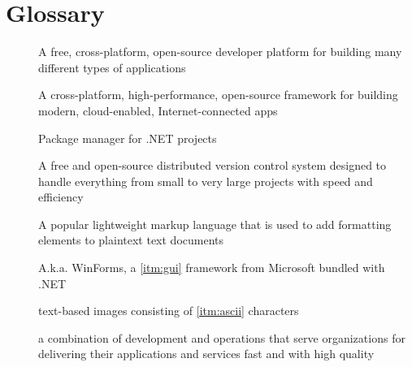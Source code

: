 \chapter*{Glossary}

\begin{description}
    \item [] A free, cross-platform, open-source developer platform for building many different types of applications \cite{microsoft_what_2022}
    \item [] A cross-platform, high-performance, open-source framework for building modern, cloud-enabled, Internet-connected apps \cite{anderson_overview_2022}
    \item [] Package manager for .NET projects \cite{microsoft_nuget_2022}
    \item [] A free and open-source distributed version control system designed to handle everything from small to very large projects with speed and efficiency \cite{git_git_2022}
    \item [] A popular lightweight markup language that is used to add formatting elements to plaintext text documents \cite{cone_getting_2022}
    \item [] A.k.a. WinForms, a \ref{itm:gui} framework from Microsoft bundled with .NET \cite{george_what_2022}
    \item [] text-based images consisting of \ref{itm:ascii} characters \cite{randal_ascii_2015}
    \item [] a combination of development and operations that serve organizations for delivering their applications and services fast and with high quality \cite{amazon_web_services_inc_what_nodate}
\end{description}